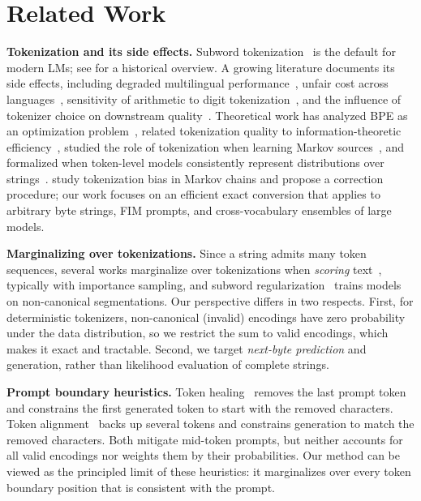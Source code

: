 \documentclass{article} %
\begin{document}
\section{Related Work}
\label{sec:related_work}
\textbf{Tokenization and its side effects.}
Subword tokenization~\citep{sennrich2016bpe,schuster2012wordpiece,kudo2018sentencepiece,wang2020bbpe} is the default for modern LMs; see \citet{mielke2021between} for a historical overview. A growing literature documents its side effects, including degraded multilingual performance~\citep{rust2021tokenizer}, unfair cost across languages~\citep{petrov2023unfairness}, sensitivity of arithmetic to digit tokenization~\citep{singh2024tokenization}, and the influence of tokenizer choice on downstream quality~\citep{ali2024tokenizer,dagan2024tokenizer}. Theoretical work has analyzed BPE as an optimization problem~\citep{zouhar2023formal}, related tokenization quality to information-theoretic efficiency~\citep{zouhar2023noiseless}, studied the role of tokenization when learning Markov sources~\citep{rajaraman2024theory}, and formalized when token-level models consistently represent distributions over strings~\citep{gastaldi2024foundations}. \citet{phan2024understanding} study tokenization bias in Markov chains and propose a correction procedure; our work focuses on an efficient exact conversion that applies to arbitrary byte strings, FIM prompts, and cross-vocabulary ensembles of large models.

\textbf{Marginalizing over tokenizations.}
Since a string admits many token sequences, several works marginalize over tokenizations when \emph{scoring} text~\citep{cao2021marginal,chirkova2023marginalize}, typically with importance sampling, and subword regularization~\citep{kudo2018subword,provilkov2020bpedropout} trains models on non-canonical segmentations. Our perspective differs in two respects. First, for deterministic tokenizers, non-canonical (invalid) encodings have zero probability under the data distribution, so we restrict the sum to valid encodings, which makes it exact and tractable. Second, we target \emph{next-byte prediction} and generation, rather than likelihood evaluation of complete strings.

\textbf{Prompt boundary heuristics.}
Token healing~\citep{lundberg2023tokenhealing,dagan2024tokenizer} removes the last prompt token and constrains the first generated token to start with the removed characters. Token alignment~\citep{athiwaratkun2024alignment} backs up several tokens and constrains generation to match the removed characters. Both mitigate mid-token prompts, but neither accounts for all valid encodings nor weights them by their probabilities. Our method can be viewed as the principled limit of these heuristics: it marginalizes over every token boundary position that is consistent with the prompt.
\end{document}
